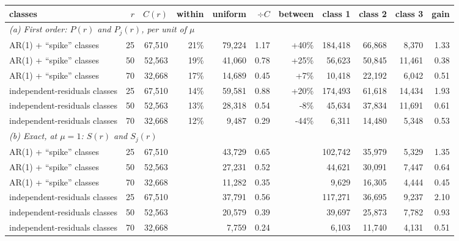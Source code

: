 \begin{tabular}{lrrrrrrrrrr}
\toprule
classes & $r$ & $C(r)$ & within & uniform & $\div C$ & between & class 1 & class 2 & class 3 & gain \\
\midrule
\multicolumn{11}{l}{\textit{(a) First order: $P(r)$ and $P_j(r)$, per unit of $\mu$}} \\
AR(1) + ``spike'' classes & 25 & 67,510 & 21\% & 79,224 & 1.17 & +40\% & 184,418 & 66,868 & 8,370 & 1.33 \\
AR(1) + ``spike'' classes & 50 & 52,563 & 19\% & 41,060 & 0.78 & +25\% & 56,623 & 50,845 & 11,461 & 0.38 \\
AR(1) + ``spike'' classes & 70 & 32,668 & 17\% & 14,689 & 0.45 & +7\% & 10,418 & 22,192 & 6,042 & 0.51 \\
independent-residuals classes & 25 & 67,510 & 14\% & 59,581 & 0.88 & +20\% & 174,493 & 61,618 & 14,434 & 1.93 \\
independent-residuals classes & 50 & 52,563 & 13\% & 28,318 & 0.54 & -8\% & 45,634 & 37,834 & 11,691 & 0.61 \\
independent-residuals classes & 70 & 32,668 & 12\% & 9,487 & 0.29 & -44\% & 6,311 & 14,480 & 5,348 & 0.53 \\
\midrule\multicolumn{11}{l}{\textit{(b) Exact, at $\mu=1$: $S(r)$ and $S_j(r)$}} \\
AR(1) + ``spike'' classes & 25 & 67,510 &  & 43,729 & 0.65 &  & 102,742 & 35,979 & 5,329 & 1.35 \\
AR(1) + ``spike'' classes & 50 & 52,563 &  & 27,231 & 0.52 &  & 44,621 & 30,091 & 7,447 & 0.64 \\
AR(1) + ``spike'' classes & 70 & 32,668 &  & 11,282 & 0.35 &  & 9,629 & 16,305 & 4,444 & 0.45 \\
independent-residuals classes & 25 & 67,510 &  & 37,791 & 0.56 &  & 117,271 & 36,695 & 9,237 & 2.10 \\
independent-residuals classes & 50 & 52,563 &  & 20,579 & 0.39 &  & 39,697 & 25,873 & 7,782 & 0.93 \\
independent-residuals classes & 70 & 32,668 &  & 7,759 & 0.24 &  & 6,103 & 11,740 & 4,131 & 0.51 \\
\bottomrule
\end{tabular}
